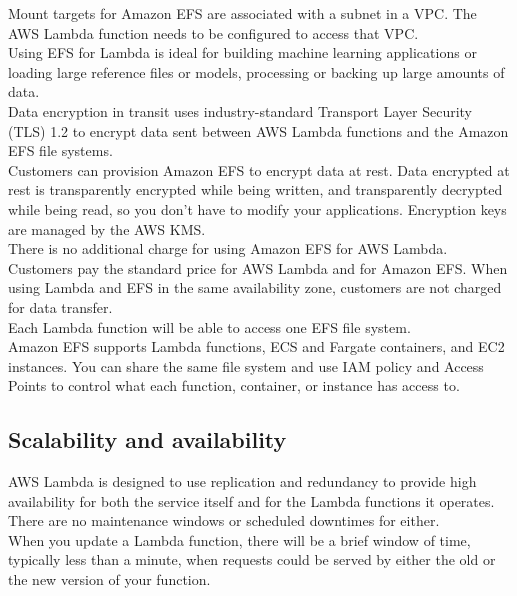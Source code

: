 \documentclass[12pt, letterpaper, twoside]{article}
\begin{document}
Mount targets for Amazon EFS are associated with a subnet in a VPC. The AWS Lambda function needs to be configured to access 
that VPC.\\

Using EFS for Lambda is ideal for building machine learning applications or loading large reference files or models, 
processing or backing up large amounts of data.\\
Data encryption in transit uses industry-standard Transport Layer Security (TLS) 1.2 to encrypt data sent between AWS Lambda 
functions and the Amazon EFS file systems.\\

Customers can provision Amazon EFS to encrypt data at rest. Data encrypted at rest is transparently encrypted while being 
written, and transparently decrypted while being read, so you don’t have to modify your applications. Encryption keys are managed 
by the AWS KMS.\\

There is no additional charge for using Amazon EFS for AWS Lambda. Customers pay the standard price for AWS Lambda and for 
Amazon EFS. When using Lambda and EFS in the same availability zone, customers are not charged for data transfer.\\

Each Lambda function will be able to access one EFS file system.\\

Amazon EFS supports Lambda functions, ECS and Fargate containers, and EC2 instances. You can share the same file system and use 
IAM policy and Access Points to control what each function, container, or instance has access to.\\


\subsection{Scalability and availability}
AWS Lambda is designed to use replication and redundancy to provide high availability for both the service itself and for the 
Lambda functions it operates. There are no maintenance windows or scheduled downtimes for either.\\

When you update a Lambda function, there will be a brief window of time, typically less than a minute, when requests could be 
served by either the old or the new version of your function.\\
\end{document}
